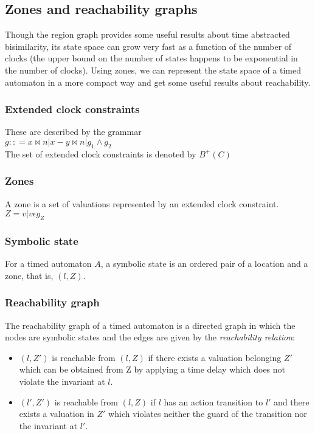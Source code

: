 \documentclass{article}
\begin{document}
\subsection{Zones and reachability graphs}

Though the region graph provides some useful results about time
abstracted bisimilarity, its state space can grow very fast as a
function of the number of clocks (the upper bound on the number of
states happens to be exponential in the number of clocks). Using
zones, we can represent the state space of a timed automaton in a more
compact way and get some useful results about reachability.

\subsubsection{Extended clock constraints}
These are described by the  grammar\\
$g :: = x \bowtie n | x - y \bowtie n | g_1 \wedge g_2$\\
The set of extended clock constraints is denoted by $B^+(C)$
\subsubsection{Zones}
A zone is a set of valuations represented by an
extended clock constraint.\\
$Z = {v|v \epsilon g_Z}$
\subsubsection{Symbolic state}
For a timed automaton $A$, a symbolic
state is an ordered pair of a location and a zone, that is, $(l,
Z)$.
\subsubsection{Reachability graph}
The reachability graph of a timed
automaton is a directed graph in which the nodes are symbolic states
and the edges are given by the \emph{reachability relation}:
\begin{itemize}
\item $(l,Z')$ is reachable from $(l,Z)$ if there exists a
  valuation belonging $Z'$ which can be obtained
  from Z by applying a time delay which does not violate the
  invariant at $l$.

\item $(l', Z')$ is reachable from $(l, Z)$ if $l$ has an action
  transition to $l'$ and there exists a valuation in $Z'$ which
  violates neither the guard of the
  transition nor the invariant at $l'$.
\end{itemize}
\end{document}
